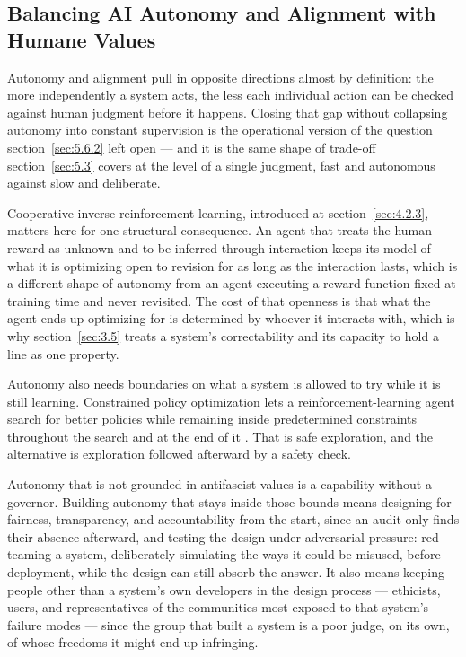 \subsection{Balancing AI Autonomy and Alignment with Humane Values}
\label{sec:5.6.3}
Autonomy and alignment pull in opposite directions almost by definition: the more independently a system acts, the less each individual action can be checked against human judgment before it happens. Closing that gap without collapsing autonomy into constant supervision is the operational version of the question section~\ref{sec:5.6.2} left open — and it is the same shape of trade-off section~\ref{sec:5.3} covers at the level of a single judgment, fast and autonomous against slow and deliberate.

Cooperative inverse reinforcement learning, introduced at section~\ref{sec:4.2.3}, matters here for one structural consequence. An agent that treats the human reward as unknown and to be inferred through interaction keeps its model of what it is optimizing open to revision for as long as the interaction lasts, which is a different shape of autonomy from an agent executing a reward function fixed at training time and never revisited. The cost of that openness is that what the agent ends up optimizing for is determined by whoever it interacts with, which is why section~\ref{sec:3.5} treats a system's correctability and its capacity to hold a line as one property.

Autonomy also needs boundaries on what a system is allowed to try while it is still learning. Constrained policy optimization lets a reinforcement-learning agent search for better policies while remaining inside predetermined constraints throughout the search and at the end of it \autocite{achiam2017constrained}. That is safe exploration, and the alternative is exploration followed afterward by a safety check.

Autonomy that is not grounded in antifascist values is a capability without a governor. Building autonomy that stays inside those bounds means designing for fairness, transparency, and accountability from the start, since an audit only finds their absence afterward, and testing the design under adversarial pressure: red-teaming a system, deliberately simulating the ways it could be misused, before deployment, while the design can still absorb the answer. It also means keeping people other than a system's own developers in the design process — ethicists, users, and representatives of the communities most exposed to that system's failure modes — since the group that built a system is a poor judge, on its own, of whose freedoms it might end up infringing.


